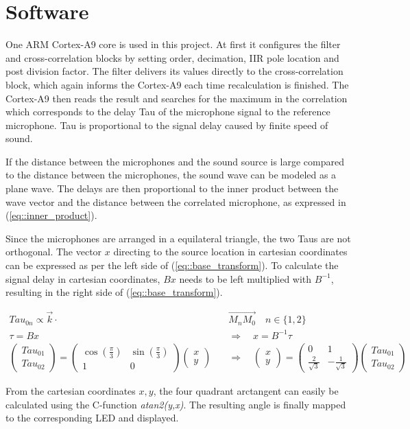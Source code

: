 \section{Software}
\label{sec::software}

One ARM Cortex-A9 core is used in this project.
At first it configures the filter and cross-correlation blocks by setting order, decimation, IIR pole location and post division factor.
The filter delivers its values directly to the cross-correlation block, which again informs the Cortex-A9 each time recalculation is finished.
The Cortex-A9 then reads the result and searches for the maximum in the correlation which corresponds to the delay Tau of the microphone signal to the reference microphone. Tau is proportional to the signal delay caused by finite speed of sound.

If the distance between the microphones and the sound source is large compared to the distance between the microphones, the sound wave can be modeled as a plane wave.
The delays are then proportional to the inner product between the wave vector and the  distance between the correlated microphone, as expressed in (\ref{eq::inner_product}).

Since the microphones are arranged in a equilateral triangle, the two Taus are not orthogonal.
The vector $x$ directing to the source location in cartesian coordinates can be expressed as per the left side of (\ref{eq::base_transform}).
To calculate the signal delay in cartesian coordinates, $Bx$ needs to be left multiplied with $B^{-1}$, resulting in the right side of  (\ref{eq::base_transform}).

\begin{align}
	{Tau}_{0n} \propto \overrightarrow{k} \cdot &\overrightarrow{M_nM_0} \quad n\in\{1,2\}\label{eq::inner_product} \\
	\tau = Bx \quad &\Rightarrow \quad x = B^{-1}\tau \label{eq::base_transform}\\
	\begin{pmatrix} {Tau}_{01} \\ {Tau}_{02}\end{pmatrix}
		=  \begin{pmatrix} \cos(\frac{\pi}{3}) & \sin(\frac{\pi}{3}) \\ 1 & 0 \end{pmatrix} \begin{pmatrix} x \\ y\end{pmatrix}
	\quad &\Rightarrow \quad \begin{pmatrix} x \\ y \end{pmatrix}	
	= \begin{pmatrix} 0 & 1 \\ \frac{2}{\sqrt{3}} & -\frac{1}{\sqrt{3}}\end{pmatrix}
	\begin{pmatrix} {Tau}_{01} \\ {Tau}_{02}\end{pmatrix}
\end{align}

From the cartesian coordinates $x,y$, the four quadrant arctangent can easily be calculated using the C-function \emph{atan2(y,x)}.
The resulting angle is finally mapped to the corresponding LED and displayed.